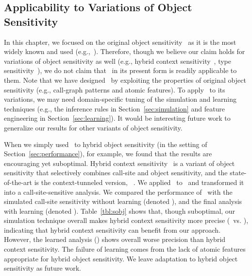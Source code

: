 






\subsection{Applicability to Variations of Object Sensitivity}

In this chapter, we focused on the original object sensitivity~\cite{Milanova2002} as it is the most widely known and used (e.g.,~\cite{Li2018b,Li2018a,TanLX16,Smaragdakis2014,GordonKPGNR_NDSS15,Feng2014,Lu:2019:PYF,Li2018a}). 
Therefore, though we believe our claim holds for variations of object sensitivity as well (e.g., hybrid context sensitivity~\cite{KastrinisS13a}, type sensitivity~\cite{Smaragdakis2011}), we do not claim that \ourtechnique~in its present form is readily applicable to them. 
Note that we have designed \ourtechnique~by exploiting the properties of original object sensitivity (e.g., call-graph patterns and atomic features). To apply \ourtechnique~to its variations, we may need domain-specific tuning of the simulation and learning techniques (e.g., the inference rules in Section~\ref{sec:simulation} and feature engineering in Section~\ref{sec:learning}). 
It would be interesting future work to generalize our results for other variants of object sensitivity.


When we simply used \ourtechnique~to hybrid object sensitivity (in the setting of Section~\ref{sec:performance}), for example, we found that the results are encouraging yet suboptimal. 
Hybrid context sensitivity~\cite{KastrinisS13a} is a variant of object sensitivity that selectively combines call-site and object sensitivity, and the state-of-the-art is the context-tunneled version,  \onesobjHT~\cite{JeJeOh18}. 
We applied \ourtechnique~to \onesobjHT~and transformed it into a call-site-sensitive analysis. 
We compared the performance of \onesobjHT~with the simulated call-site sensitivity without learning (denoted \simonecallH), and the final analysis with learning (denoted \sobjSimLearn). 
Table~\ref{tbl:sobj} shows that, though suboptimal, our simulation technique overall makes hybrid context sensitivity more precise (\simonecallH~vs. \onesobjHT), indicating that hybrid context sensitivity can benefit from our approach. However, the learned analysis (\sobjSimLearn) shows overall worse precision than hybrid context sensitivity.  
The failure of learning comes from the lack of atomic features appropriate for hybrid object sensitivity. We leave adaptation to hybrid object sensitivity as future work. 


